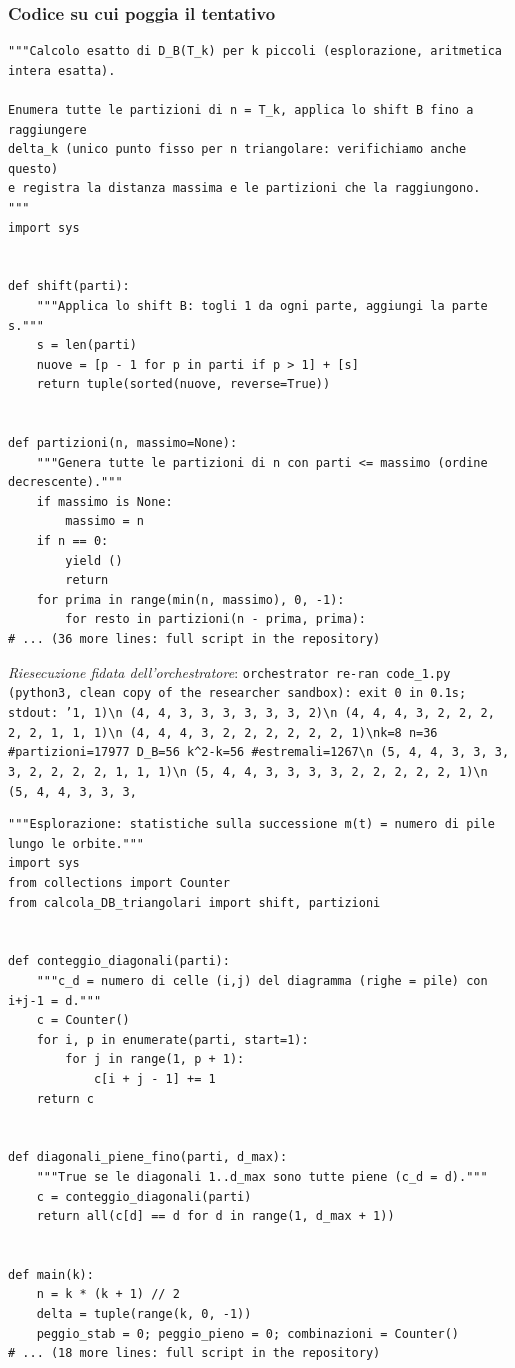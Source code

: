 \documentclass[11pt,a4paper]{article}
\begin{document}
\subsubsection{Codice su cui poggia il tentativo}
\begin{lstlisting}[caption={attempt\_001 code\_1 [python, rigore exact] — Exhaustive exact computation of D\_B(T\_k) and of all extremal partitions for k ≤ 9 (all par — verdetto del Referee: REJECT}]
"""Calcolo esatto di D_B(T_k) per k piccoli (esplorazione, aritmetica intera esatta).

Enumera tutte le partizioni di n = T_k, applica lo shift B fino a raggiungere
delta_k (unico punto fisso per n triangolare: verifichiamo anche questo)
e registra la distanza massima e le partizioni che la raggiungono.
"""
import sys


def shift(parti):
    """Applica lo shift B: togli 1 da ogni parte, aggiungi la parte s."""
    s = len(parti)
    nuove = [p - 1 for p in parti if p > 1] + [s]
    return tuple(sorted(nuove, reverse=True))


def partizioni(n, massimo=None):
    """Genera tutte le partizioni di n con parti <= massimo (ordine decrescente)."""
    if massimo is None:
        massimo = n
    if n == 0:
        yield ()
        return
    for prima in range(min(n, massimo), 0, -1):
        for resto in partizioni(n - prima, prima):
# ... (36 more lines: full script in the repository)
\end{lstlisting}
\noindent\emph{Riesecuzione fidata dell'orchestratore}: \texttt{orchestrator re-ran code\_1.py (python3, clean copy of the researcher sandbox): exit 0 in 0.1s; stdout: '1, 1)\textbackslash{}n    (4, 4, 3, 3, 3, 3, 3, 3, 2)\textbackslash{}n    (4, 4, 4, 3, 2, 2, 2, 2, 2, 1, 1, 1)\textbackslash{}n    (4, 4, 4, 3, 2, 2, 2, 2, 2, 2, 1)\textbackslash{}nk=8 n=36 \#partizioni=17977 D\_B=56 k\textasciicircum{}2-k=56 \#estremali=1267\textbackslash{}n    (5, 4, 4, 3, 3, 3, 3, 2, 2, 2, 2, 1, 1, 1)\textbackslash{}n    (5, 4, 4, 3, 3, 3, 3, 2, 2, 2, 2, 2, 1)\textbackslash{}n    (5, 4, 4, 3, 3, 3,}
\begin{lstlisting}[caption={attempt\_001 code\_2 [python, rigore exact] — Exploration only: along every orbit for k ≤ 8, records the last time the pile count leaves — verdetto del Referee: REJECT}]
"""Esplorazione: statistiche sulla successione m(t) = numero di pile lungo le orbite."""
import sys
from collections import Counter
from calcola_DB_triangolari import shift, partizioni


def conteggio_diagonali(parti):
    """c_d = numero di celle (i,j) del diagramma (righe = pile) con i+j-1 = d."""
    c = Counter()
    for i, p in enumerate(parti, start=1):
        for j in range(1, p + 1):
            c[i + j - 1] += 1
    return c


def diagonali_piene_fino(parti, d_max):
    """True se le diagonali 1..d_max sono tutte piene (c_d = d)."""
    c = conteggio_diagonali(parti)
    return all(c[d] == d for d in range(1, d_max + 1))


def main(k):
    n = k * (k + 1) // 2
    delta = tuple(range(k, 0, -1))
    peggio_stab = 0; peggio_pieno = 0; combinazioni = Counter()
# ... (18 more lines: full script in the repository)
\end{lstlisting}
\end{document}
